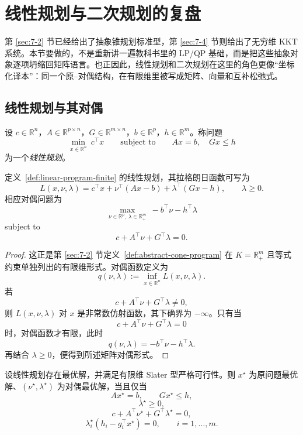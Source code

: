\section{线性规划与二次规划的复盘}

\label{sec:8-2}

第 \ref{sec:7-2} 节已经给出了抽象锥规划标准型，第 \ref{sec:7-4} 节则给出了无穷维 KKT 系统。本节要做的，不是重新讲一遍教科书里的 LP/QP 基础，而是把这些抽象对象逐项坍缩回矩阵语言。也正因此，线性规划和二次规划在这里的角色更像“坐标化译本”：同一个原--对偶结构，在有限维里被写成矩阵、向量和互补松弛式。

\subsection{线性规划与其对偶}

\begin{definition}[有限维线性规划]\label{def:linear-program-finite}
设 $c\in \mathbb R^n$，$A\in \mathbb R^{p\times n}$，$G\in \mathbb R^{m\times n}$，$b\in \mathbb R^p$，$h\in \mathbb R^m$。称问题
\[
\min_{x\in \mathbb R^n}\ c^\top x
\qquad \text{subject to}\qquad
Ax=b,\quad Gx\le h
\]
为一个\emph{线性规划}。
\end{definition}

\begin{proposition}[LP 的矩阵对偶形式]\label{prop:lp-dual-matrix-form}
定义~\ref{def:linear-program-finite} 的线性规划，其拉格朗日函数可写为
\[
L(x,\nu,\lambda)=c^\top x+\nu^\top(Ax-b)+\lambda^\top(Gx-h),
\qquad \lambda\ge 0.
\]
相应对偶问题为
\[
\max_{\nu\in \mathbb R^p,\ \lambda\in \mathbb R_+^m}\ -b^\top \nu-h^\top \lambda
\]
subject to
\[
c+A^\top \nu+G^\top \lambda=0.
\]
\end{proposition}

\begin{proof}
这正是第 \ref{sec:7-2} 节定义~\ref{def:abstract-cone-program} 在 $K=\mathbb R_+^m$ 且等式约束单独列出的有限维形式。对偶函数定义为
\[
q(\nu,\lambda):=\inf_{x\in \mathbb R^n}L(x,\nu,\lambda).
\]
若
\[
c+A^\top \nu+G^\top \lambda\neq 0,
\]
则 $L(x,\nu,\lambda)$ 对 $x$ 是非常数仿射函数，其下确界为 $-\infty$。只有当
\[
c+A^\top \nu+G^\top \lambda=0
\]
时，对偶函数才有限，此时
\[
q(\nu,\lambda)=-b^\top \nu-h^\top \lambda.
\]
再结合 $\lambda\ge 0$，便得到所述矩阵对偶形式。
\end{proof}

\begin{theorem}\label{thm:lp-kkt-matrix}
设线性规划存在最优解，并满足有限维 Slater 型严格可行性。则 $x^\star$ 为原问题最优解、$(\nu^\star,\lambda^\star)$ 为对偶最优解，当且仅当
\[
Ax^\star=b,\qquad Gx^\star\le h,
\]
\[
\lambda^\star\ge 0,
\]
\[
c+A^\top \nu^\star+G^\top \lambda^\star=0,
\]
\[
\lambda_i^\star(h_i-g_i^\top x^\star)=0,\qquad i=1,\dots,m.
\]
\end{theorem}

